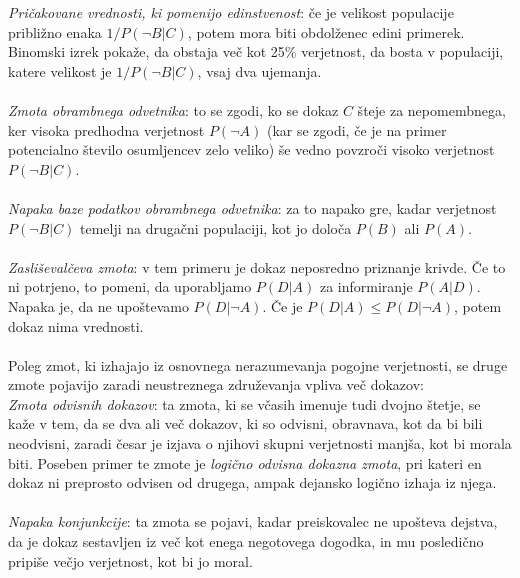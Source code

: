 \documentclass[mat1, tisk]{fmfdelo}
\theoremstyle{definition} %
\theoremstyle{trditev} %
\theoremstyle{izrek}
\begin{document}
\textit{Pričakovane vrednosti, ki pomenijo edinstvenost}: če je velikost populacije približno enaka $1/P(\neg B \lvert C)$, potem mora biti
obdolženec edini primerek. Binomski izrek pokaže, da obstaja več kot 25\% verjetnost, da bosta v populaciji, katere velikost je $1/P(\neg B \lvert C)$,
vsaj dva ujemanja.\\\\
\textit{Zmota obrambnega odvetnika}: to se zgodi, ko se dokaz $C$ šteje za nepomembnega, ker visoka predhodna verjetnost $P(\neg A)$ (kar
se zgodi, če je na primer potencialno število osumljencev zelo veliko) še vedno povzroči visoko verjetnost $P(\neg B \lvert C)$. \\\\
\textit{Napaka baze podatkov obrambnega odvetnika}: za to napako gre, kadar verjetnost $P(\neg B \lvert C)$ temelji na drugačni populaciji,
kot jo določa $P(B)$ ali $P(A)$.\\\\
\textit{Zasliševalčeva zmota}: v tem primeru je dokaz neposredno priznanje krivde. Če to ni potrjeno, to pomeni, da uporabljamo $P(D \lvert A)$ za
informiranje $P(A \lvert D)$. Napaka je, da ne upoštevamo $P(D \lvert \neg A)$. Če je $P(D \lvert A) \leq P(D \lvert \neg A)$, potem dokaz
nima vrednosti.\\\\
Poleg zmot, ki izhajajo iz osnovnega nerazumevanja pogojne verjetnosti, se druge zmote pojavijo zaradi neustreznega združevanja vpliva več dokazov:\\
\textit{Zmota odvisnih dokazov}: ta zmota, ki se včasih imenuje tudi dvojno štetje, se kaže v tem, da se dva ali več dokazov, ki so odvisni,
obravnava, kot da bi bili neodvisni, zaradi česar je izjava o njihovi skupni verjetnosti manjša, kot bi morala biti. Poseben primer te zmote je
\textit{logično odvisna dokazna zmota}, pri kateri en dokaz ni preprosto odvisen od drugega, ampak dejansko logično izhaja iz njega.\\\\
\textit{Napaka konjunkcije}: ta zmota se pojavi, kadar preiskovalec ne upošteva dejstva, da je dokaz sestavljen iz več kot enega negotovega dogodka,
in mu posledično pripiše večjo verjetnost, kot bi jo moral.

\end{document}
